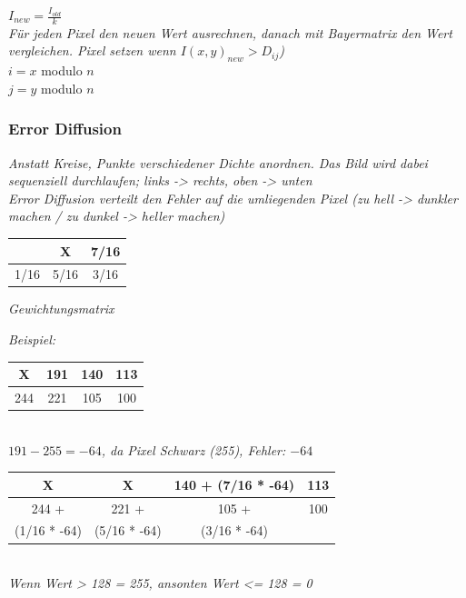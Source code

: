 $I_{new} = \frac{I_{old}}{k}$ \\
\textit{
    Für jeden Pixel den neuen Wert ausrechnen,
    danach mit Bayermatrix den Wert vergleichen.
    Pixel setzen wenn $I(x,y)_{new} > D_{ij}$)
} \\

$i = x$ modulo $n$ \\
$j = y$ modulo $n$ \\

\subsubsection{Error Diffusion}

\textit{
    Anstatt Kreise, Punkte verschiedener Dichte anordnen.
    Das Bild wird dabei sequenziell durchlaufen; links -> rechts, oben -> unten
} \\
\textit{Error Diffusion verteilt den Fehler auf die umliegenden Pixel (zu hell -> dunkler machen / zu dunkel -> heller machen)} \\

\begin{tabular}{|c|c|c|}
    \hline
    & \textbf{X} & 7/16 \\
    \hline
    1/16 & 5/16 & 3/16 \\
    \hline
\end{tabular}

\textit{Gewichtungsmatrix}

\textit{Beispiel:}

\begin{tabular}{|c|c|c|c|}
    \hline
    X & \textbf{191} & 140 & 113 \\
    \hline
    244 & 221 & 105 & 100 \\
    \hline
\end{tabular} \\

\textit{$191 - 255 = -64$, da Pixel Schwarz (255), Fehler: $-64$}

\begin{tabular}{|c|c|c|c|}
    \hline
    X & \textbf{X} & 140 + (7/16 * -64) & 113 \\
    \hline
    244 + & 221 + & 105 + & 100 \\
    (1/16 * -64) & (5/16 * -64) & (3/16 * -64) & \\
    \hline
\end{tabular} \\

\textit{Wenn Wert > 128 = 255, ansonten Wert <= 128 = 0}